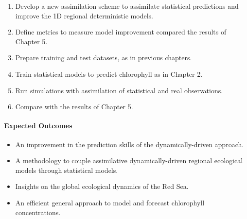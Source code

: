 \begin{enumerate}

\item Develop a new assimilation scheme to assimilate statistical predictions
and improve the 1D regional deterministic models.

\item Define metrics to measure model improvement compared the results of Chapter
5.

\item Prepare training and test datasets, as in previous chapters.

\item Train statistical models to predict chlorophyll as in Chapter 2.

\item Run simulations with assimilation of statistical and real observations.

\item Compare with the results of Chapter 5.

\end{enumerate}

\paragraph{Expected Outcomes}

\begin{itemize}

\item An improvement in the prediction skills of the dynamically-driven
approach.

\item A methodology to couple assimilative dynamically-driven regional
ecological models through statistical models.

\item Insights on the global ecological dynamics of the Red Sea.

\item An efficient general approach to model and forecast chlorophyll
concentrations.

\end{itemize}
